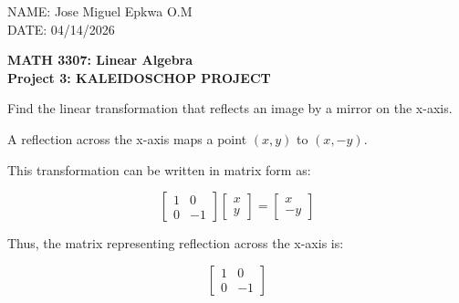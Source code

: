 
\begin{flushright}
    NAME: Jose Miguel Epkwa O.M\\
    DATE: 04/14/2026
\end{flushright}
\vspace{0.5cm}

\begin{center}
    \textbf{MATH 3307: Linear Algebra\\
    Project 3: KALEIDOSCHOP PROJECT\\}
    \vspace{0.5cm}
\end{center}

\begin{problem}
   Find the linear transformation that reflects an image by a mirror on the x-axis.
   
   \vspace{0.3cm}
   
  A reflection across the x-axis maps a point $(x, y)$ to $(x, -y)$.


     \vspace{0.3cm}

This transformation can be written in matrix form as:

    \[
        \begin{bmatrix}
           1 & 0 \\
           0 & -1
        \end{bmatrix}
        \begin{bmatrix}
           x \\
           y
        \end{bmatrix}
           =
        \begin{bmatrix}
           x \\
           - y
        \end{bmatrix}
    \]

     \vspace{0.3cm}

Thus, the matrix representing reflection across the x-axis is:

\[
        \begin{bmatrix}
           1 & 0 \\
           0 & -1
        \end{bmatrix}
\]
        \end{problem}

    \vspace{0.5cm}

